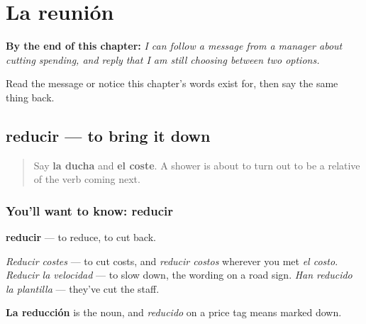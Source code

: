 
\chapter{La reunión}
\label{ch:es-jefe}

\begin{chapteropening}
\textbf{By the end of this chapter:} \emph{I can follow a message from a manager about cutting spending, and reply that I am still choosing between two options.}

Read the message or notice this chapter's words exist for, then say the same thing back.
\end{chapteropening}

\section[reducir]{reducir — to bring it down}

\label{lesson:ES-C462-reducir}



\begin{quote}
Say \textbf{la ducha} and \textbf{el coste}. A shower is about to turn out to be a relative of the verb coming next.
\end{quote}

\subsection*{You'll want to know: reducir}
\textbf{reducir} — to reduce, to cut back.

\emph{Reducir costes} — to cut costs, and \emph{reducir costos} wherever you met \emph{el costo}. \emph{Reducir la velocidad} — to slow down, the wording on a road sign. \emph{Han reducido la plantilla} — they've cut the staff.

\textbf{La reducción} is the noun, and \emph{reducido} on a price tag means marked down.

